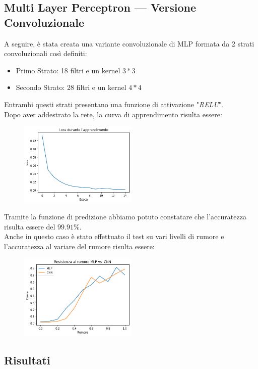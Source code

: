 \documentclass[12pt, a4paper]{article}
\begin{document}
\subsection{Multi Layer Perceptron --- Versione Convoluzionale}
A seguire, è stata creata una variante convoluzionale di MLP formata da 2 strati convoluzionali così definiti:
\begin{itemize}
    \item Primo Strato: 18 filtri e un kernel \(3*3\)
    \item Secondo Strato: 28 filtri e un kernel \(4*4\)
\end{itemize}
Entrambi questi strati presentano una funzione di attivazione "\textit{RELU}".\\
Dopo aver addestrato la rete, la curva di apprendimento risulta essere:
\begin{figure}[H]
    \centering
    \includegraphics[width=0.50\textwidth]{Curva_Conv.png}
\end{figure}
Tramite la funzione di predizione abbiamo potuto constatare che l'accuratezza risulta essere del \(99.91\%\).\\
Anche in questo caso è stato effettuato il test su vari livelli di rumore e l'accuratezza al variare del rumore risulta essere:
\begin{figure}[H]
    \centering
    \includegraphics[width=0.50\textwidth]{Rumore_Conv.png}
\end{figure}

\subsection{Risultati}
\end{document}
